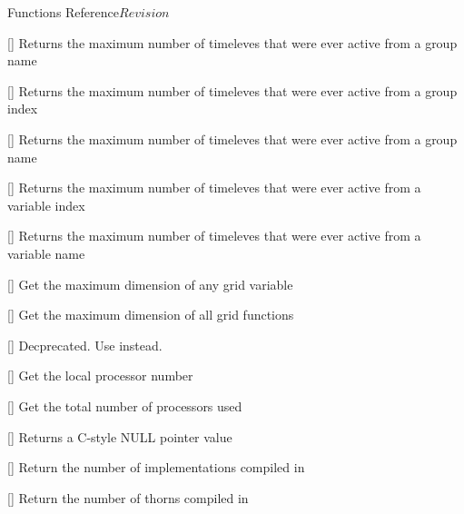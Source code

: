 \begin{cactuspart}{ Functions Reference}{}{$Revision$}
\begin{Lentry}
\item[\code{CCTK\_MaxActiveTimeLevels}] [\pageref{CCTK-MaxActiveTimeLevels}]
  Returns the maximum number of timeleves that were ever active from a group name

\item[\code{CCTK\_MaxActiveTimeLevelsGI}] [\pageref{CCTK-MaxActiveTimeLevels}]
  Returns the maximum number of timeleves that were ever active from a group index

\item[\code{CCTK\_MaxActiveTimeLevelsGN}] [\pageref{CCTK-MaxActiveTimeLevels}]
  Returns the maximum number of timeleves that were ever active from a group name

\item[\code{CCTK\_MaxActiveTimeLevelsVI}] [\pageref{CCTK-MaxActiveTimeLevels}]
  Returns the maximum number of timeleves that were ever active from a variable index

\item[\code{CCTK\_MaxActiveTimeLevelsVN}] [\pageref{CCTK-MaxActiveTimeLevels}]
  Returns the maximum number of timeleves that were ever active from a variable name

\item[\code{CCTK\_MaxDim}] [\pageref{CCTK-MaxDim}]
  Get the maximum dimension of any grid variable

\item[\code{CCTK\_MaxGFDim}] [\pageref{CCTK-MaxGFDim}]
  Get the maximum dimension of all grid functions

\item[\code{CCTK\_MaxTimeLevels}] [\pageref{CCTK-MaxTimeLevels}]
  Decprecated. Use  instead.

\item[\code{CCTK\_MyProc}] [\pageref{CCTK-MyProc}]
  Get the local processor number

\item[\code{CCTK\_nProcs}] [\pageref{CCTK-nProcs}]
  Get the total number of processors used

\item[\code{CCTK\_NullPointer}] [\pageref{CCTK-NullPointer}]
  Returns a C-style NULL pointer value

\item[\code{CCTK\_NumCompiledImplementations}]
  [\pageref{CCTK-NumCompiledImplementations}]
  Return the number of implementations compiled in

\item[\code{CCTK\_NumCompiledThorns}] [\pageref{CCTK-NumCompiledThorns}]
  Return the number of thorns compiled in


\end{Lentry}
\end{cactuspart}

